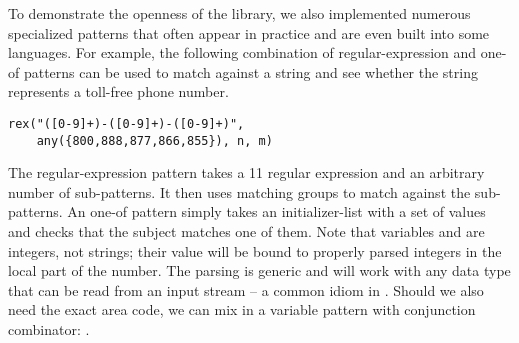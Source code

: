 To demonstrate the openness of the library, we also implemented numerous 
specialized patterns that often appear in practice and are even built into some 
languages. For example, the following combination of regular-expression and one-of 
patterns can be used to match against a string and see whether the string 
represents a toll-free phone number. 

\begin{lstlisting}
rex("([0-9]+)-([0-9]+)-([0-9]+)", 
    any({800,888,877,866,855}), n, m)
\end{lstlisting}

\noindent
The regular-expression pattern takes a \Cpp{}11 regular expression and an 
arbitrary number of sub-patterns. It then uses matching groups to match against 
the sub-patterns. An one-of pattern simply takes an initializer-list with a set of 
values and checks that the subject matches one of them. Note that variables 
 and  are integers, not strings; their value will be bound to 
properly parsed integers in the local part of the number. The parsing is generic 
and will work with any data type that can be read from an input stream -- a 
common idiom in \Cpp{}. Should we also need the exact area code, we can mix in a 
variable pattern with conjunction combinator: .

